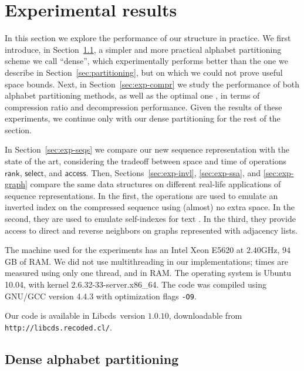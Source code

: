 \documentclass[11pt]{article}
\newcommand{\access}
    {\ensuremath{\mathsf{access}}}
\newcommand{\rank}
    {\ensuremath{\mathsf{rank}}}
\newcommand{\select}
    {\ensuremath{\mathsf{select}}}
\newcommand{\libcds}{{\sc Libcds}}
\begin{document}
\section{Experimental results}
\label{sec:exper}

In this section we explore the performance of our structure in practice. We 
first introduce, in Section~\ref{sec:dense}, a simpler and more practical 
alphabet partitioning scheme we call ``dense'', which experimentally performs 
better than the 
one we describe in Section~\ref{sec:partitioning}, but on which we could not 
prove useful space bounds. Next, in Section~\ref{sec:exp-compr} we study the 
performance of both alphabet partitioning methods, as well as the optimal one 
\cite{Sai05}, in terms of compression ratio and decompression performance. 
Given the results of these experiments, we continue only with our dense
partitioning for the rest of the section.

In Section~\ref{sec:exp-seqs} we compare our new sequence representation
with the state of the art, considering the tradeoff between space and time
of operations $\rank$, $\select$, and $\access$. Then,
Sections~\ref{sec:exp-invl}, \ref{sec:exp-ssa}, and \ref{sec:exp-graph} 
compare the same data structures on different real-life applications of 
sequence representations. In the first, the operations are used to emulate an
inverted index on the compressed sequence using (almost) no
extra space. In the second, they are used to emulate self-indexes for text
\cite{NM07}. In the third, they provide access to direct and reverse neighbors 
on graphs represented with adjacency lists.

The machine used for the experiments has an
Intel\textsuperscript{\textregistered}
Xeon\textsuperscript{\textregistered} E5620 at $2.40$GHz, $94$GB of
RAM. We did not use multithreading in our implementations; times
are measured using only one thread, and in RAM.
The operating system is Ubuntu 10.04, with
kernel 2.6.32-33-server.x86\_64. The code was compiled using GNU/GCC
version 4.4.3 with optimization flags \verb|-O9|.

Our code is available in \libcds\ version $1.0.10$, downloadable
from \verb|http://libcds.recoded.cl/|.
 

\subsection{Dense alphabet partitioning}
\label{sec:dense}
\end{document}
